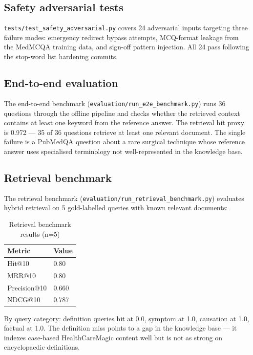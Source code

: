 \subsection{Safety adversarial tests}

\texttt{tests/test\_safety\_adversarial.py} covers 24 adversarial inputs targeting three failure modes: emergency redirect bypass attempts, MCQ-format leakage from the MedMCQA training data, and sign-off pattern injection. All 24 pass following the stop-word list hardening commits.

\subsection{End-to-end evaluation}

The end-to-end benchmark (\texttt{evaluation/run\_e2e\_benchmark.py}) runs 36 questions through the offline pipeline and checks whether the retrieved context contains at least one keyword from the reference answer. The retrieval hit proxy is 0.972 --- 35 of 36 questions retrieve at least one relevant document. The single failure is a PubMedQA question about a rare surgical technique whose reference answer uses specialised terminology not well-represented in the knowledge base.

\subsection{Retrieval benchmark}

The retrieval benchmark (\texttt{evaluation/run\_retrieval\_benchmark.py}) evaluates hybrid retrieval on 5 gold-labelled queries with known relevant documents:

\begin{table}[htbp]
\centering
\caption{Retrieval benchmark results (n=5)}
\renewcommand{\arraystretch}{1.3}
\begin{tabular}{|l|l|}
\hline
\textbf{Metric} & \textbf{Value} \\
\hline
Hit@10 & 0.80 \\
MRR@10 & 0.80 \\
Precision@10 & 0.660 \\
NDCG@10 & 0.787 \\
\hline
\end{tabular}
\end{table}

By query category: definition queries hit at 0.0, symptom at 1.0, causation at 1.0, factual at 1.0. The definition miss points to a gap in the knowledge base --- it indexes case-based HealthCareMagic content well but is not as strong on encyclopaedic definitions.
